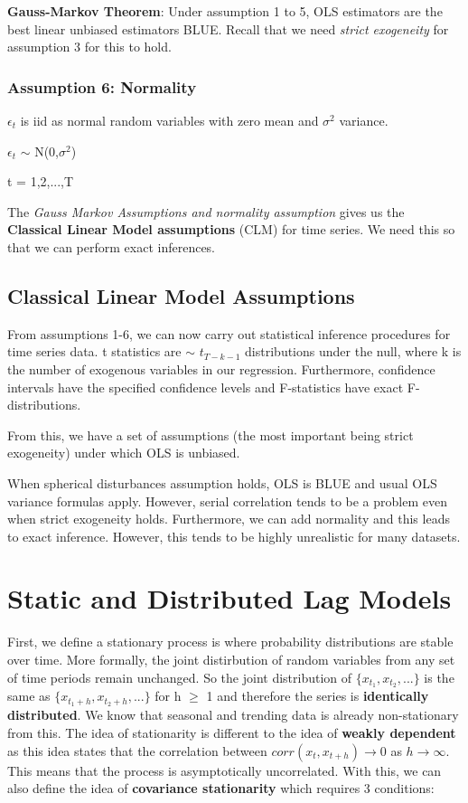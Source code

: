 \documentclass[11pt, oneside]{article}
\theoremstyle{definition}
\begin{document}
\textbf{Gauss-Markov Theorem}: Under assumption 1 to 5, OLS estimators are the best linear unbiased estimators BLUE. Recall that we need \textit{strict exogeneity} for assumption 3 for this to hold.

\subsubsection{Assumption 6: Normality}
$\epsilon_t$ is iid as normal random variables with zero mean and $\sigma^2$ variance.
\begin{center}
  $\epsilon_t$ $\sim$ N(0,$\sigma^2$)

  t = 1,2,...,T
\end{center}

The \textit{Gauss Markov Assumptions and normality assumption} gives us the \textbf{Classical Linear Model assumptions} (CLM) for time series. We need this so that we can perform exact inferences.

\subsection{Classical Linear Model Assumptions}

From assumptions 1-6, we can now carry out statistical inference procedures for time series data. t statistics are $\sim$ $t_{T-k-1}$ distributions under the null, where k is the number of exogenous variables in our regression. Furthermore, confidence intervals have the specified confidence levels and F-statistics have exact F-distributions.

From this, we have a set of assumptions (the most important being strict exogeneity) under which OLS is unbiased.

When spherical disturbances assumption holds, OLS is BLUE and usual OLS variance formulas apply. However, serial correlation tends to be a problem even when strict exogeneity holds. Furthermore, we can add normality and this leads to exact inference. However, this tends to be highly unrealistic for many datasets.
\newpage

\section{Static and Distributed Lag Models}

First, we define a stationary process is where probability distributions are stable over time. More formally, the joint distirbution of random variables from any set of time periods remain unchanged. So the joint distribution of $\{x_{t_1},x_{t_2},...\}$ is the same as $\{x_{t_1+h},x_{t_2+h},...\}$ for h $\geq$ 1 and therefore the series is \textbf{identically distributed}. We know that seasonal and trending data is already non-stationary from this. The idea of stationarity is different to the idea of \textbf{weakly dependent} as this idea states that the correlation between $corr(x_t, x_{t+h}) \rightarrow 0$ as $h \rightarrow \infty$. This means that the process is asymptotically uncorrelated. With this, we can also define the idea of \textbf{covariance stationarity} which requires 3 conditions:
\end{document}
